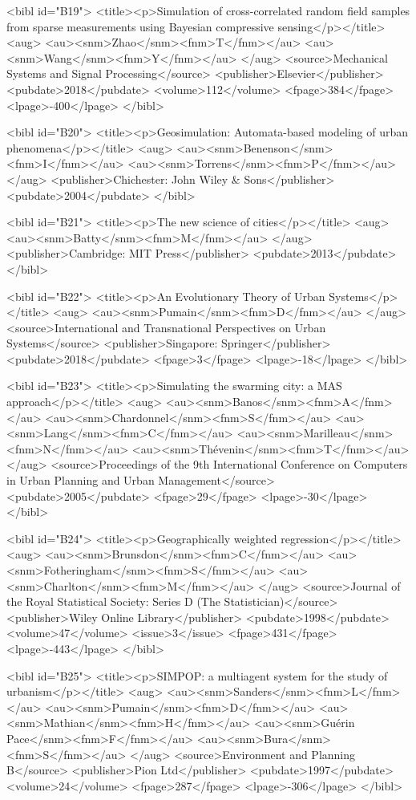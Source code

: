 \documentclass{bmcart}
\begin{document}
\begin{backmatter}
{<bibl id="B19">
  <title><p>Simulation of cross-correlated random field samples from sparse
  measurements using Bayesian compressive sensing</p></title>
  <aug>
    <au><snm>Zhao</snm><fnm>T</fnm></au>
    <au><snm>Wang</snm><fnm>Y</fnm></au>
  </aug>
  <source>Mechanical Systems and Signal Processing</source>
  <publisher>Elsevier</publisher>
  <pubdate>2018</pubdate>
  <volume>112</volume>
  <fpage>384</fpage>
  <lpage>-400</lpage>
</bibl>

<bibl id="B20">
  <title><p>Geosimulation: Automata-based modeling of urban
  phenomena</p></title>
  <aug>
    <au><snm>Benenson</snm><fnm>I</fnm></au>
    <au><snm>Torrens</snm><fnm>P</fnm></au>
  </aug>
  <publisher>Chichester: John Wiley \& Sons</publisher>
  <pubdate>2004</pubdate>
</bibl>

<bibl id="B21">
  <title><p>The new science of cities</p></title>
  <aug>
    <au><snm>Batty</snm><fnm>M</fnm></au>
  </aug>
  <publisher>Cambridge: MIT Press</publisher>
  <pubdate>2013</pubdate>
</bibl>

<bibl id="B22">
  <title><p>An Evolutionary Theory of Urban Systems</p></title>
  <aug>
    <au><snm>Pumain</snm><fnm>D</fnm></au>
  </aug>
  <source>International and Transnational Perspectives on Urban
  Systems</source>
  <publisher>Singapore: Springer</publisher>
  <pubdate>2018</pubdate>
  <fpage>3</fpage>
  <lpage>-18</lpage>
</bibl>

<bibl id="B23">
  <title><p>Simulating the swarming city: a MAS approach</p></title>
  <aug>
    <au><snm>Banos</snm><fnm>A</fnm></au>
    <au><snm>Chardonnel</snm><fnm>S</fnm></au>
    <au><snm>Lang</snm><fnm>C</fnm></au>
    <au><snm>Marilleau</snm><fnm>N</fnm></au>
    <au><snm>Th{\'e}venin</snm><fnm>T</fnm></au>
  </aug>
  <source>Proceedings of the 9th International Conference on Computers in Urban
  Planning and Urban Management</source>
  <pubdate>2005</pubdate>
  <fpage>29</fpage>
  <lpage>-30</lpage>
</bibl>

<bibl id="B24">
  <title><p>Geographically weighted regression</p></title>
  <aug>
    <au><snm>Brunsdon</snm><fnm>C</fnm></au>
    <au><snm>Fotheringham</snm><fnm>S</fnm></au>
    <au><snm>Charlton</snm><fnm>M</fnm></au>
  </aug>
  <source>Journal of the Royal Statistical Society: Series D (The
  Statistician)</source>
  <publisher>Wiley Online Library</publisher>
  <pubdate>1998</pubdate>
  <volume>47</volume>
  <issue>3</issue>
  <fpage>431</fpage>
  <lpage>-443</lpage>
</bibl>

<bibl id="B25">
  <title><p>SIMPOP: a multiagent system for the study of urbanism</p></title>
  <aug>
    <au><snm>Sanders</snm><fnm>L</fnm></au>
    <au><snm>Pumain</snm><fnm>D</fnm></au>
    <au><snm>Mathian</snm><fnm>H</fnm></au>
    <au><snm>Gu{\'e}rin Pace</snm><fnm>F</fnm></au>
    <au><snm>Bura</snm><fnm>S</fnm></au>
  </aug>
  <source>Environment and Planning B</source>
  <publisher>Pion Ltd</publisher>
  <pubdate>1997</pubdate>
  <volume>24</volume>
  <fpage>287</fpage>
  <lpage>-306</lpage>
</bibl>

}
\end{backmatter}
\end{document}
